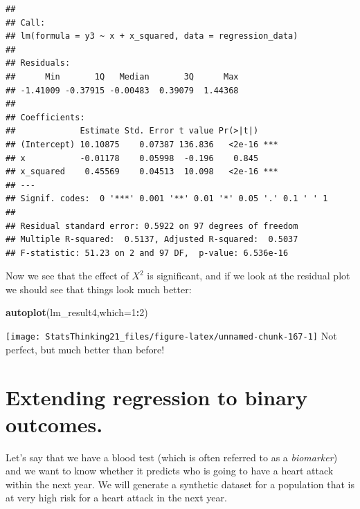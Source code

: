 \documentclass[12pt,]{book}
\newenvironment{Shaded}{\begin{snugshade}}{\end{snugshade}}
\newcommand{\DataTypeTok}[1]{\textcolor[rgb]{0.13,0.29,0.53}{#1}}
\newcommand{\DecValTok}[1]{\textcolor[rgb]{0.00,0.00,0.81}{#1}}
\newcommand{\KeywordTok}[1]{\textcolor[rgb]{0.13,0.29,0.53}{\textbf{#1}}}
\newcommand{\NormalTok}[1]{#1}
\newcommand{\OperatorTok}[1]{\textcolor[rgb]{0.81,0.36,0.00}{\textbf{#1}}}
\begin{document}
\begin{verbatim}
## 
## Call:
## lm(formula = y3 ~ x + x_squared, data = regression_data)
## 
## Residuals:
##      Min       1Q   Median       3Q      Max 
## -1.41009 -0.37915 -0.00483  0.39079  1.44368 
## 
## Coefficients:
##             Estimate Std. Error t value Pr(>|t|)    
## (Intercept) 10.10875    0.07387 136.836   <2e-16 ***
## x           -0.01178    0.05998  -0.196    0.845    
## x_squared    0.45569    0.04513  10.098   <2e-16 ***
## ---
## Signif. codes:  0 '***' 0.001 '**' 0.01 '*' 0.05 '.' 0.1 ' ' 1
## 
## Residual standard error: 0.5922 on 97 degrees of freedom
## Multiple R-squared:  0.5137, Adjusted R-squared:  0.5037 
## F-statistic: 51.23 on 2 and 97 DF,  p-value: 6.536e-16
\end{verbatim}

Now we see that the effect of \(X^2\) is significant, and if we look at the residual plot we should see that things look much better:

\begin{Shaded}
\begin{Highlighting}[]
\KeywordTok{autoplot}\NormalTok{(lm_result4,}\DataTypeTok{which=}\DecValTok{1}\OperatorTok{:}\DecValTok{2}\NormalTok{)}
\end{Highlighting}
\end{Shaded}

\texttt{[image: StatsThinking21\_files/figure-latex/unnamed-chunk-167-1]}
Not perfect, but much better than before!

\hypertarget{extending-regression-to-binary-outcomes.}{%
\section{Extending regression to binary outcomes.}\label{extending-regression-to-binary-outcomes.}}

Let's say that we have a blood test (which is often referred to as a \emph{biomarker}) and we want to know whether it predicts who is going to have a heart attack within the next year. We will generate a synthetic dataset for a population that is at very high risk for a heart attack in the next year.
\end{document}
